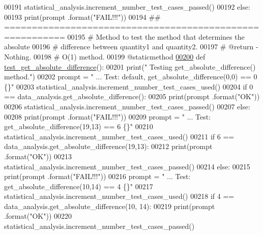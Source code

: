 \begin{DoxyCode}
00191             statistical\_analysis.increment\_number\_test\_cases\_passed()
00192         \textcolor{keywordflow}{else}:
00193             print(prompt .format(\textcolor{stringliteral}{"FAIL!!!"}))
00194     \textcolor{comment}{## =========================================================}
00195     \textcolor{comment}{#   Method to test the method that determines the absolute}
00196     \textcolor{comment}{#       difference between quantity1 and quantity2.}
00197     \textcolor{comment}{#   @return - Nothing.}
00198     \textcolor{comment}{#   O(1) method.}
00199     @staticmethod
\hypertarget{test__data__analysis__tool_8py_source_l00200}{}\hyperlink{classstatistics_1_1test__data__analysis__tool_1_1data__analysis__tester_a3b1f6f4fd16ef986ead81484c80fc164}{00200}     \textcolor{keyword}{def }\hyperlink{classstatistics_1_1test__data__analysis__tool_1_1data__analysis__tester_a3b1f6f4fd16ef986ead81484c80fc164}{test\_get\_absolute\_difference}():
00201         print(\textcolor{stringliteral}{" Testing get\_absolute\_difference() method."})
00202         prompt = \textcolor{stringliteral}{"  ... Test: default, get\_absolute\_difference(0,0) == 0    \{\}"}
00203         statistical\_analysis.increment\_number\_test\_cases\_used()
00204         \textcolor{keywordflow}{if} 0 == data\_analysis.get\_absolute\_difference():
00205             print(prompt .format(\textcolor{stringliteral}{"OK"}))
00206             statistical\_analysis.increment\_number\_test\_cases\_passed()
00207         \textcolor{keywordflow}{else}:
00208             print(prompt .format(\textcolor{stringliteral}{"FAIL!!!"}))
00209         prompt = \textcolor{stringliteral}{"  ... Test: get\_absolute\_difference(19,13) == 6       \{\}"}
00210         statistical\_analysis.increment\_number\_test\_cases\_used()
00211         \textcolor{keywordflow}{if} 6 == data\_analysis.get\_absolute\_difference(19,13):
00212             print(prompt .format(\textcolor{stringliteral}{"OK"}))
00213             statistical\_analysis.increment\_number\_test\_cases\_passed()
00214         \textcolor{keywordflow}{else}:
00215             print(prompt .format(\textcolor{stringliteral}{"FAIL!!!"}))
00216         prompt = \textcolor{stringliteral}{"  ... Test: get\_absolute\_difference(10,14) == 4       \{\}"}
00217         statistical\_analysis.increment\_number\_test\_cases\_used()
00218         \textcolor{keywordflow}{if} 4 == data\_analysis.get\_absolute\_difference(10, 14):
00219             print(prompt .format(\textcolor{stringliteral}{"OK"}))
00220             statistical\_analysis.increment\_number\_test\_cases\_passed()

\end{DoxyCode}

